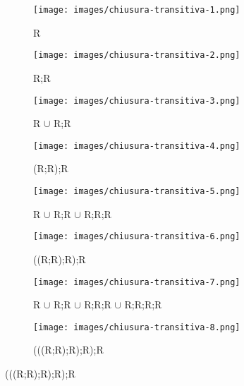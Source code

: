\begin{figure}[h!]
    \centering
    \begin{subfigure}{.3\textwidth}
        \centering
        \texttt{[image: images/chiusura-transitiva-1.png]}
        \caption{R}
        \label{}
    \end{subfigure}
    \hfill
    \begin{subfigure}{.3\textwidth}
        \centering
        \texttt{[image: images/chiusura-transitiva-2.png]}
        \caption{R;R}
        \label{}
    \end{subfigure}
    \hfill
    \begin{subfigure}{.3\textwidth}
        \centering
        \texttt{[image: images/chiusura-transitiva-3.png]}
        \caption{R $\cup$ R;R}
        \label{}
    \end{subfigure}
    \hfill
    \begin{subfigure}{.3\textwidth}
        \vspace{15pt}
        \centering
        \texttt{[image: images/chiusura-transitiva-4.png]}
        \caption{(R;R);R}
        \label{}
    \end{subfigure}
    \hfill
    \begin{subfigure}{.3\textwidth}
        \vspace{15pt}
        \centering
        \texttt{[image: images/chiusura-transitiva-5.png]}
        \caption{R $\cup$ R;R $\cup$ R;R;R}
        \label{}
    \end{subfigure}
    \hfill
    \begin{subfigure}{.3\textwidth}
        \vspace{15pt}
        \centering
        \texttt{[image: images/chiusura-transitiva-6.png]}
        \caption{((R;R);R);R}
        \label{}
    \end{subfigure}
    \hfill
    \begin{subfigure}{.3\textwidth}
        \vspace{15pt}
        \centering
        \texttt{[image: images/chiusura-transitiva-7.png]}
        \caption{R $\cup$ R;R $\cup$ R;R;R $\cup$ R;R;R;R}
        \label{}
    \end{subfigure}
    \hspace{2cm}
    \begin{subfigure}{.3\textwidth}
        \vspace{15pt}
        \centering
        \texttt{[image: images/chiusura-transitiva-8.png]}
        \caption{(((R;R);R);R);R}
        \label{}
    \end{subfigure}
\end{figure}
